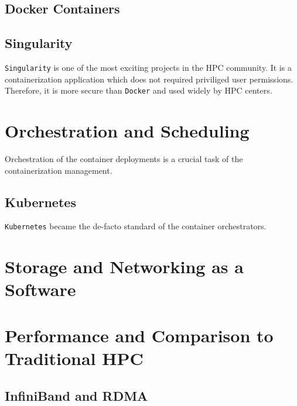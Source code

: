 \subsection{Docker Containers}
\subsection{Singularity}
\texttt{Singularity} is one of the most exciting projects in the HPC community. It is a containerization 
application which does not required priviliged user permissions. Therefore, it is more secure than
\texttt{Docker} and used widely by HPC centers.


\section{Orchestration and Scheduling}
Orchestration of the container deployments is a crucial task of the containerization management.
\subsection{Kubernetes}
\texttt{Kubernetes} became the de-facto standard of the container orchestrators.

\section{Storage and Networking as a Software}

\section{Performance and Comparison to Traditional HPC}
\subsection{InfiniBand and RDMA}

